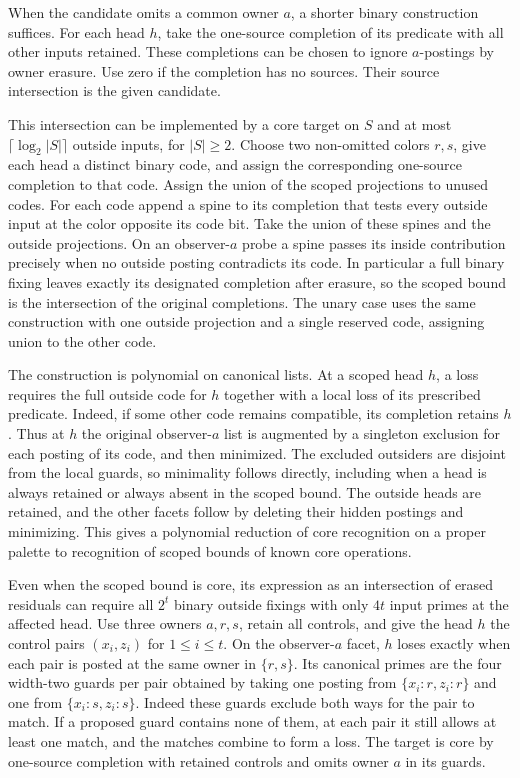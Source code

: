 When the candidate omits a common owner $a$,
a shorter binary construction suffices.
For each head $h$, take the
one-source completion of its predicate with all
other inputs retained. These completions can be
chosen to ignore $a$-postings by owner erasure.
Use zero if the completion has no sources.
Their source intersection is the given candidate.

This intersection can be implemented by a core
target on $S$ and at most $\lceil\log_2|S|\rceil$
outside inputs, for $|S|\geq2$. Choose two
non-omitted colors $r,s$, give each head a
distinct binary code, and assign the corresponding
one-source completion to that code. Assign the
union of the scoped projections to unused codes.
For each code append a spine to its completion
that tests every outside input at the color
opposite its code bit. Take the union of these
spines and the outside projections. On an
observer-$a$ probe a spine passes its inside
contribution precisely when no outside posting
contradicts its code. In particular a full binary
fixing leaves exactly its designated completion
after erasure, so the scoped bound is the
intersection of the original completions.
The unary case uses the same construction with
one outside projection and a single reserved
code, assigning union to the other code.

The construction is polynomial on canonical lists.
At a scoped head $h$, a loss requires the full
outside code for $h$ together with a local loss of
its prescribed predicate. Indeed, if some other
code remains compatible, its completion retains
$h$. Thus at $h$ the original observer-$a$ list is
augmented by a singleton exclusion for each
posting of its code, and then minimized. The
excluded outsiders are disjoint from the local
guards, so minimality follows directly, including
when a head is always retained or always absent
in the scoped bound. The outside heads are
retained, and the other facets follow by
deleting their hidden postings and minimizing.
This gives a polynomial reduction of core
recognition on a proper palette to recognition of
scoped bounds of known core operations.

Even when the scoped bound is core, its expression as
an intersection of erased residuals can require all
$2^t$ binary outside fixings with only $4t$ input
primes at the affected head. Use three owners
$a,r,s$, retain all controls, and give the head $h$
the control pairs $(x_i,z_i)$ for $1\leq i\leq t$.
On the observer-$a$ facet, $h$ loses exactly when
each pair is posted at the same owner in $\{r,s\}$.
Its canonical primes are the four width-two guards
per pair obtained by taking one posting from
$\{x_i:r,z_i:r\}$ and one from $\{x_i:s,z_i:s\}$.
Indeed these guards exclude both ways for the pair
to match. If a proposed guard contains none of
them, at each pair it still allows at least one
match, and the matches combine to form a loss.
The target is core by one-source completion with
retained controls and omits owner $a$ in its guards.

